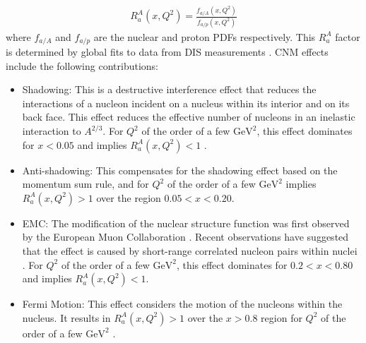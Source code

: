\begin{align}
R_a^A (x, Q^2) = \frac{f_{a/A} (x, Q^2)}{f_{a/p}(x, Q^2)}
\end{align}
where $f_{a/A}$ and $f_{a/p}$ are the nuclear and proton PDFs respectively. This $R_a^A$ factor is determined by global fits to data from DIS measurements \cite{PhysRevC.76.065207, PhysRevD.69.074028, Eskola_2009}. CNM effects include the following contributions:
\begin{itemize}
\item Shadowing: This is a destructive interference effect that reduces the interactions of a nucleon incident on a nucleus within its interior and on its back face. This effect reduces the effective number of nucleons in an inelastic interaction to $A^{2/3}$. For $Q^2$ of the order of a few $\mathrm{GeV}^2$, this effect dominates for $x < 0.05$ and implies $R_a^A (x, Q^2) < 1$  \cite{PhysRevLett.64.1342}.
\item Anti-shadowing: This compensates for the shadowing effect based on the momentum sum rule, and for $Q^2$ of the order of a few $\mathrm{GeV}^2$ implies $R_a^A (x, Q^2) > 1$ over the region $0.05 < x < 0.20$.
\item EMC: The modification of the nuclear structure function was first observed by the European Muon Collaboration \cite{AUBERT1983275}. Recent observations have suggested that the effect is caused by short-range correlated nucleon pairs within nuclei \cite{PhysRevC.85.047301}. For $Q^2$ of the order of a few $\mathrm{GeV}^2$, this effect dominates for $0.2 < x < 0.80$ and implies $R_a^A (x, Q^2) < 1$.
\item  Fermi Motion: This effect considers the motion of the nucleons within the nucleus. It results in $R_a^A (x, Q^2) > 1$  over the $x > 0.8$ region for $Q^2$ of the order of a few $\mathrm{GeV}^2$ \cite{Saito:1985ct}.

\end{itemize}


